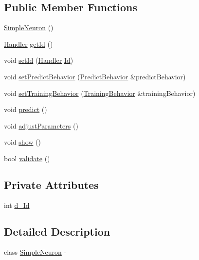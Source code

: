 \subsection*{Public Member Functions}
\begin{DoxyCompactItemize}
\item 
\hyperlink{class_simple_neuron_a38c2d75287caf6374c1252c35f73dce2}{SimpleNeuron} ()
\item 
\hyperlink{_a_m_o_r_e_8h_abc871abb71cff6655b8172ee7240b8ef}{Handler} \hyperlink{class_simple_neuron_a2ed8cdd977472afaecca2c6b27c6beef}{getId} ()
\item 
void \hyperlink{class_simple_neuron_a7330de5a6a79925b950f78a65c529297}{setId} (\hyperlink{_a_m_o_r_e_8h_abc871abb71cff6655b8172ee7240b8ef}{Handler} \hyperlink{class_neuron_a72bb327a7c5c865e6748a4e074ce0680}{Id})
\item 
void \hyperlink{class_simple_neuron_a8c39b00a2f52ec952ee32c71000de7cb}{setPredictBehavior} (\hyperlink{class_predict_behavior}{PredictBehavior} \&predictBehavior)
\item 
void \hyperlink{class_simple_neuron_a00e47ccebbc56c146aef75b5d29a192a}{setTrainingBehavior} (\hyperlink{class_training_behavior}{TrainingBehavior} \&trainingBehavior)
\item 
void \hyperlink{class_simple_neuron_a232e6c3a7205372e3ccb7e93f26c58b6}{predict} ()
\item 
void \hyperlink{class_simple_neuron_ac2dfa64ef339acc860102e864c60d433}{adjustParameters} ()
\item 
void \hyperlink{class_simple_neuron_afea22112336409283a5bb7d281f7f4bd}{show} ()
\item 
bool \hyperlink{class_simple_neuron_a9e7173abb892281d0b2ffb0efc82f0e5}{validate} ()
\end{DoxyCompactItemize}
\subsection*{Private Attributes}
\begin{DoxyCompactItemize}
\item 
int \hyperlink{class_simple_neuron_ad87b0b67c7f8bfe5377313c1e3fac60c}{d\_\-Id}
\end{DoxyCompactItemize}


\subsection{Detailed Description}
class \hyperlink{class_simple_neuron}{SimpleNeuron} -\/ 

